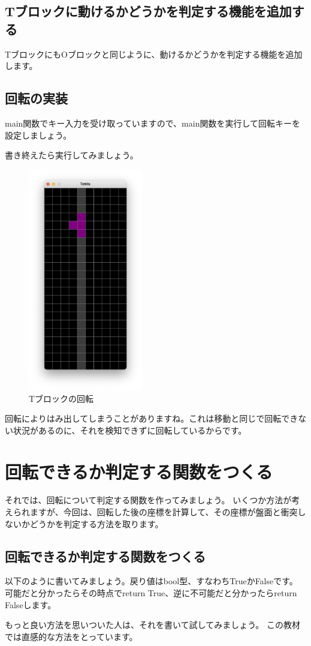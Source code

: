 \subsection{Tブロックに動けるかどうかを判定する機能を追加する}
TブロックにもOブロックと同じように、動けるかどうかを判定する機能を追加します。


\subsection{回転の実装}
main関数でキー入力を受け取っていますので、main関数を実行して回転キーを設定しましょう。


書き終えたら実行してみましょう。
\begin{figure}[h]
  \centering
  \includegraphics[width=50mm]{images/CH7_4.png}
  \caption{Tブロックの回転}
\end{figure}

回転によりはみ出してしまうことがありますね。これは移動と同じで回転できない状況があるのに、それを検知できずに回転しているからです。

\section{回転できるか判定する関数をつくる}
それでは、回転について判定する関数を作ってみましょう。
いくつか方法が考えられますが、今回は、回転した後の座標を計算して、その座標が盤面と衝突しないかどうかを判定する方法を取ります。
\subsection{回転できるか判定する関数をつくる}
以下のように書いてみましょう。戻り値はbool型、すなわちTrueかFalseです。
可能だと分かったらその時点でreturn True、逆に不可能だと分かったらreturn Falseします。

もっと良い方法を思いついた人は、それを書いて試してみましょう。
この教材では直感的な方法をとっています。

